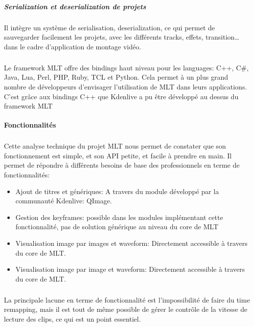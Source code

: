 \subparagraph{Serialization et deserialization de projets}

\subparagraph{}

Il intègre un système de serialisation, deserialization, ce qui permet
de sauvegarder facilement les projets, avec les différents tracks,
effets, transition\ldots dans le cadre d'application de montage vidéo.

\subparagraph{}

Le framework MLT offre des bindings haut niveau pour les languages:
C++, C\#, Java, Lua, Perl, PHP, Ruby, TCL et Python. Cela permet à
un plus grand nombre de développeurs d'envisager l'utilisation de MLT
dans leurs applications. C'est grâce aux bindings C++ que Kdenlive a
pu être développé au dessus du framework MLT

\paragraph{Fonctionnalités}

\subparagraph{ }

Cette analyse technique du projet MLT nous permet de constater que
son fonctionnement est simple, et son API petite, et facile à prendre
en main.  Il permet de répondre à différents besoins de base  des
professionnels en terme de fonctionnalités:

\begin{itemize}

  \item {Ajout de titres et génériques: A travers du module développé
  par la
    communauté Kdenlive: QImage.}

  \item {Gestion des keyframes: possible dans les modules implémentant
    cette fonctionnalité, pas de solution générique au niveau du core
    de MLT}

  \item {Visualisation image par images et waveform: Directement
  accessible à
    travers du core de MLT.}

  \item {Visualisation image par image et waveform: Directement
  accessible à
    travers du core de MLT.}

\end{itemize}

\subparagraph{}

La principale lacune en terme de fonctionnalité est l'impossibilité de
faire du time remapping, mais il est tout de même possible de gérer
le contrôle de la vitesse de lecture des clips, ce qui est un point
essentiel.

